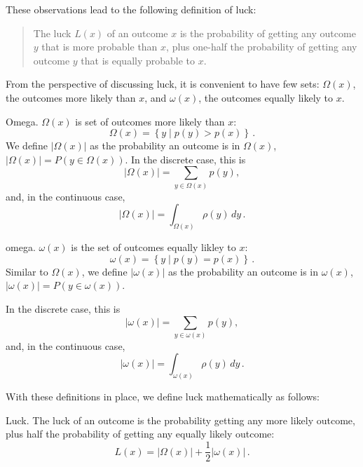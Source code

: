 These observations lead to the following definition of luck:
\begin{quote}
The luck $L(x)$ of an outcome $x$ is the probability of getting any outcome $y$ that is more probable than $x$, plus one-half the probability of getting any outcome $y$ that is equally probable to $x$.
\end{quote}

From the perspective of discussing luck, it is convenient to have few sets: $\Omega(x)$, the outcomes more likely than $x$, and $\omega(x)$, the outcomes equally likely to $x$.

\begin{definition}{Omega.}  $\Omega(x)$ is set of outcomes more likely than $x$:
\begin{equation}
\Omega(x) = \left\{ y \mid p(y)>p(x) \right\} \,.
\end{equation}
We define $|\Omega(x)|$ as the probability an outcome is in $\Omega(x)$,
$|\Omega(x)| = P(y\in\Omega(x))$.  In the discrete case, this is
\begin{equation}
|\Omega(x)| = \sum_{y \in \Omega(x)} p(y),
\end{equation}
and, in the continuous case,
\begin{equation}
|\Omega(x)| = \int_{\Omega(x)} \rho(y)\,dy \,.
\end{equation}
\end{definition}

\begin{definition}{omega.}
$\omega(x)$ is the set of outcomes equally likley to $x$:
\begin{equation}
\omega(x) = \left\{ y \mid p(y)=p(x) \right\} \,.
\end{equation}
Similar to $\Omega(x)$, we define $|\omega(x)|$ as the probability an outcome is in $\omega(x)$,
$|\omega(x)| = P(y\in\omega(x))$.  

In the discrete case, this is
\begin{equation}
|\omega(x)| = \sum_{y \in \omega(x)} p(y),
\end{equation}
and, in the continuous case,
\begin{equation}
|\omega(x)| = \int_{\omega(x)} \rho(y)\,dy \,.
\end{equation}
\end{definition}

With these definitions in place, we define luck mathematically as follows:
\begin{definition}{Luck.}  The luck of an outcome is the probability getting any more likely outcome, plus half the probability of getting any equally likely outcome:
\begin{equation}
L(x)=|\Omega(x)| + \frac{1}{2} |\omega(x)| \,.
\end{equation}
\end{definition}

